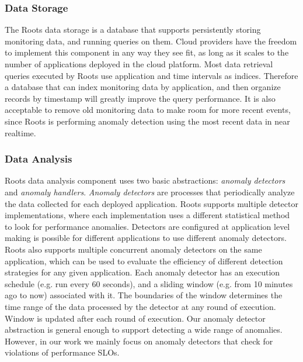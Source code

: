 \subsubsection{Data Storage}

The Roots data storage is a database that supports persistently storing monitoring data, and running
queries on them.  
Cloud providers have the freedom to implement this component in any way they see fit, as long
as it scales to the number of applications deployed in the cloud platform. Most data retrieval queries executed
by Roots use application and time intervals as indices. Therefore a database that can index monitoring
data by application, and then organize records by timestamp will greatly improve the query performance.
It is also acceptable to remove old monitoring data to make room for more recent events, since Roots
is performing anomaly detection using the most recent data in near realtime.

\subsubsection{Data Analysis}

Roots data analysis component uses two basic abstractions: \textit{anomaly detectors} 
and \textit{anomaly handlers}.
\textit{Anomaly detectors} are processes that periodically analyze the data collected for
each deployed application. Roots supports multiple detector implementations, where each implementation
uses a different statistical method to look for performance anomalies. Detectors are configured
at application level making is possible for different applications to use different anomaly 
detectors. Roots also supports multiple concurrent anomaly detectors on the same application, which can be used
to evaluate the efficiency of different detection strategies for any given application. Each
anomaly detector has an execution schedule (e.g. run every 60 seconds), and a sliding window 
(e.g. from 10 minutes ago to now)
associated with it. The boundaries of the window determines the time range
of the data processed by the detector at any round of execution. Window is updated 
after each round of execution. Our anomaly detector abstraction is general
enough to support detecting a wide range of anomalies. However, in our work we
mainly focus on anomaly detectors that check for violations of performance SLOs.

